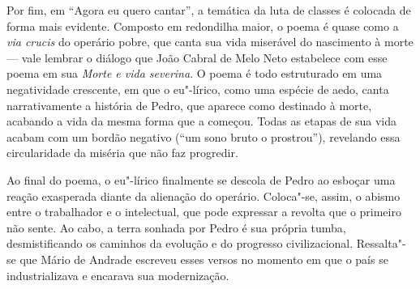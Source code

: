 Por fim, em ``Agora eu quero cantar'', a temática da luta de classes é colocada de forma mais evidente. Composto em redondilha maior, o poema é quase como a \textit{via crucis} do operário pobre, que canta sua vida miserável do nascimento à morte --- vale lembrar o diálogo que João Cabral de Melo Neto estabelece com esse poema em sua \textit{Morte e vida severina}.
O poema é todo estruturado em uma negatividade crescente, em que o eu"-lírico, como uma espécie de aedo, canta narrativamente a história de Pedro, que aparece como destinado à morte, acabando a vida da mesma forma que a começou.
Todas as etapas de sua vida acabam com um bordão negativo (``um sono bruto o prostrou''), revelando essa circularidade da miséria que não faz progredir.

Ao final do poema, o eu"-lírico finalmente se descola de Pedro ao esboçar uma reação exasperada diante da alienação do operário.
Coloca"-se, assim, o abismo entre o trabalhador e o intelectual, que pode expressar a revolta que o primeiro não sente. Ao cabo, a terra sonhada por Pedro é sua própria tumba, desmistificando os caminhos da evolução e do progresso civilizacional.
Ressalta"-se que Mário de Andrade escreveu esses versos no momento em que o país se industrializava e encarava sua modernização.


